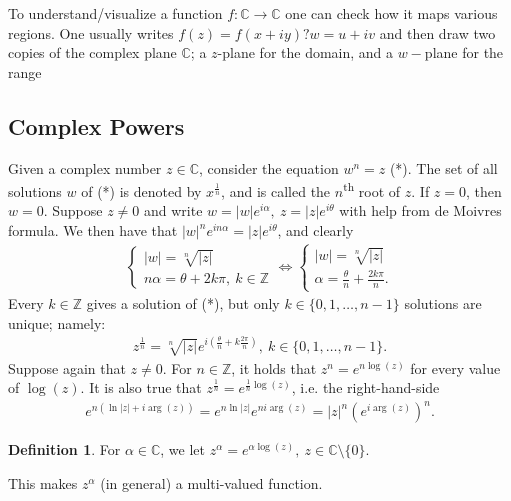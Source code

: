 \documentclass[12pt, a4paper]{article}
\theoremstyle{plain}
\theoremstyle{definition}
\newtheorem{definition}{Definition} %
\begin{document}
			To understand/visualize a function $f:\mathbb{C}\to\mathbb{C}$ one can check how it maps various regions. One usually writes $f(z)=f(x+iy) ? w = u+iv$ and then draw two copies of the complex plane $\mathbb{C}$; a $z$-plane for the domain, and a $w-$plane for the range
		\subsection{Complex Powers} %
		\label{sub:complex_powers}
			Given a complex number $z\in \mathbb{C}$, consider the equation $w^n=z$ (*). The set of all solutions $w$ of (*) is denoted by $x^{\frac{1}{n}}$, and is called the $n$\textsuperscript{th} root of $z$. If $z=0$, then $w=0$. Suppose $z\not=0$ and write $w=|w|e^{i \alpha},\:z=|z|e^{i\theta}$ with help from de Moivres formula. We then have that $|w|^ne^{in \alpha} = |z|e^{i\theta}$, and clearly
			\begin{align*}
				\begin{cases}
					|w| = \sqrt[n]{|z|}\\
					n\alpha = \theta + 2k\pi,\:k\in \mathbb{Z}
				\end{cases}\iff
				\begin{cases}
					|w| = \sqrt[n]{|z|}\\
					\alpha = \frac{\theta}{n} + \frac{2k\pi}{n}.
				\end{cases}
			\end{align*}
			Every $k\in \mathbb{Z}$ gives a solution of (*), but only $k\in\{0,1,\ldots,n-1\}$ solutions are unique; namely:
			\begin{align*}
				z^{\frac{1}{n}} = \sqrt[n]{|z|}e^{i(\frac{\theta}{n}+k \frac{2\pi}{n})},\: k\in\{0,1,\ldots,n-1\}.
			\end{align*}
			Suppose again that $z\not=0$. For $n\in \mathbb{Z}$, it holds that $z^n=e^{n\log(z)}$ for every value of $\log(z)$. It is also true that $z^{\frac{1}{n}} = e^{\frac{1}{n}\log(z)}$, i.e. the right-hand-side
			\begin{align*}
				e^{n(\ln|z|+i\arg(z))} = e^{n\ln|z|}e^{ni\arg(z)} = |z|^n(e^{i\arg(z)})^n.
			\end{align*}
			\begin{definition}
				For $\alpha\in \mathbb{C}$, we let $z^\alpha = e^{\alpha\log(z)},\:z\in \mathbb{C}\setminus\{0\}$.
			\end{definition}

			This makes $z^\alpha$ (in general) a multi-valued function.\\
\end{document}
